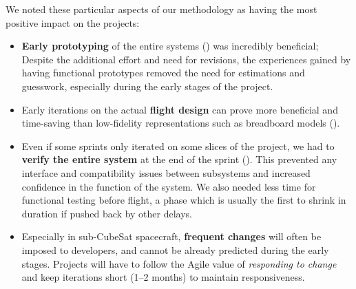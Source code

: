 \documentclass[journal,10pt]{IEEEtran}
\begin{document}
We noted these particular aspects of our methodology as having the most positive impact on the projects: 

\begin{itemize}
	\item \textbf{Early prototyping} of the entire systems () was incredibly beneficial; Despite the additional effort and need for revisions, the experiences gained by having functional prototypes removed the need for estimations and guesswork, especially during the early stages of the project.
	\item Early iterations on the actual \textbf{flight design} can prove more beneficial and time-saving than low-fidelity representations such as breadboard models ().
	\item Even if some sprints only iterated on some slices of the project, we had to \textbf{verify the entire system} at the end of the sprint (). This prevented any interface and compatibility issues between subsystems and increased confidence in the function of the system. We also needed less time for functional testing before flight, a phase which is usually the first to shrink in duration if pushed back by other delays.
	\item Especially in sub-CubeSat spacecraft, \textbf{frequent changes} will often be imposed to developers, and cannot be already predicted during the early stages. Projects will have to follow the Agile value of \emph{responding to change} \autocite{beckAgileManifesto2001} and keep iterations short (1--2 months) to maintain responsiveness.
\end{itemize}
\end{document}

